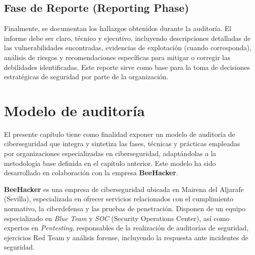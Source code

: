 \documentclass[a4paper, 11pt]{article}
\begin{document}
\subsection{Fase de Reporte (Reporting Phase)}

Finalmente, se documentan los hallazgos obtenidos durante la auditoría. El informe debe ser claro, técnico y ejecutivo, incluyendo descripciones detalladas de las vulnerabilidades encontradas, evidencias de explotación (cuando corresponda), análisis de riesgos y recomendaciones específicas para mitigar o corregir las debilidades identificadas. Este reporte sirve como base para la toma de decisiones estratégicas de seguridad por parte de la organización.






















\clearpage
\thispagestyle{nohead}



\section{Modelo de auditoría}
\par\vspace{0.5cm}


El presente capítulo tiene como finalidad exponer un modelo de auditoría de ciberseguridad que integra y sintetiza las fases, técnicas y prácticas empleadas por organizaciones especializadas en ciberseguridad, adaptándolas a la metodología base definida en el capítulo anterior. Este modelo ha sido desarrollado en colaboración con la empresa \textbf{BeeHacker}.
\par\vspace{0.5cm}

\textbf{BeeHacker} es una empresa de ciberseguridad ubicada en Mairena del Aljarafe (Sevilla), especializada en ofrecer servicios relacionados con el cumplimiento normativo, la ciberdefensa y las pruebas de penetración. Disponen de un equipo especializado en \textit{Blue Team} y \textit{SOC} (Security Operations Center), así como expertos en \textit{Pentesting}, responsables de la realización de auditorías de seguridad, ejercicios Red Team y análisis forense, incluyendo la respuesta ante incidentes de seguridad. \cite{beehacker}
\end{document}
